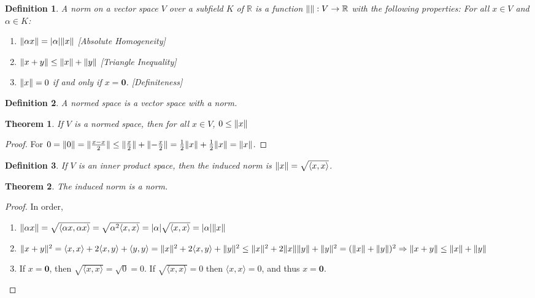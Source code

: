 \documentclass[oneside]{book}
\theoremstyle{mystyle}
\newtheorem{theorem}{Theorem}[section]
\newtheorem{definition}{Definition}[section]
\DeclarePairedDelimiter\norm{\lVert}{\rVert}
\begin{document}
\begin{definition}
A norm on a vector space $V$ over a subfield $K$ of $\mathbb{R}$ is a function $\norm{}:V\rightarrow \mathbb{R}$ with the following properties: For all $x \in V$ and $\alpha \in K$:
\begin{enumerate}
\item $\norm{\alpha x} = |\alpha| \norm{x}$ \hfill [Absolute Homogeneity]
\item $\norm{x+y} \leq \norm{x}+\norm{y}$ \hfill [Triangle Inequality]
\item $\norm{x} = 0$ if and only if $x = \mathbf{0}$. \hfill [Definiteness]
\end{enumerate}
\end{definition}

\begin{definition}
A normed space is a vector space with a norm.
\end{definition}

\begin{theorem}
If $V$ is a normed space, then for all $x\in V$, $0\leq \norm{x}$
\end{theorem}
\begin{proof}
For $0=\norm{0} = \norm{\frac{x-x}{2}} \leq \norm{\frac{x}{2}}+\norm{-\frac{x}{2}} = \frac{1}{2}\norm{x} + \frac{1}{2}\norm{x} = \norm{x}$.
\end{proof}

\begin{definition}
If $V$ is an inner product space, then the induced norm is $\norm{x}=\sqrt{\langle x,x \rangle}$.
\end{definition}

\begin{theorem}
The induced norm is a norm.
\end{theorem}
\begin{proof}
In order,
\begin{enumerate}
\item $\norm{\alpha x} = \sqrt{\langle \alpha x, \alpha x \rangle} = \sqrt{\alpha^2 \langle x,x\rangle} = |\alpha| \sqrt{\langle x,x \rangle} = |\alpha| \norm{x}$
\item $\norm{x+y}^2= \langle x,x \rangle + 2\langle x,y \rangle + \langle y,y \rangle = \norm{x}^2 + 2\langle x,y \rangle + \norm{y}^2 \leq \norm{x}^2 +2\norm{x}\norm{y} + \norm{y}^2 = (\norm{x}+\norm{y})^2\Rightarrow \norm{x+y}\leq \norm{x}+\norm{y}$
\item If $x= \mathbf{0}$, then $\sqrt{\langle x,x \rangle} = \sqrt{0} = 0$. If $\sqrt{\langle x,x \rangle} = 0$ then $\langle x,x \rangle = 0$, and thus $x = \mathbf{0}$.
\end{enumerate}
\end{proof}
\end{document}
